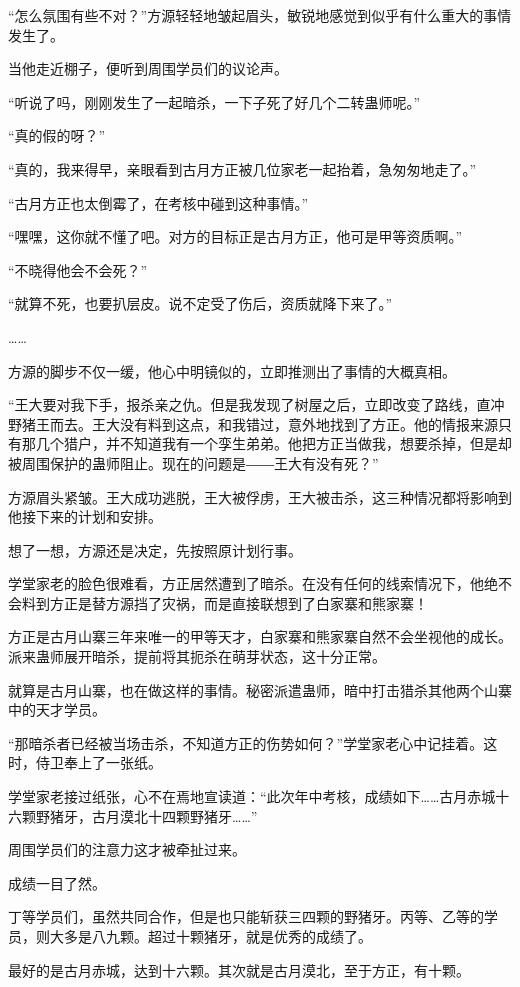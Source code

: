 \begin{this_body}
“怎么氛围有些不对？”方源轻轻地皱起眉头，敏锐地感觉到似乎有什么重大的事情发生了。

当他走近棚子，便听到周围学员们的议论声。

“听说了吗，刚刚发生了一起暗杀，一下子死了好几个二转蛊师呢。”

“真的假的呀？”

“真的，我来得早，亲眼看到古月方正被几位家老一起抬着，急匆匆地走了。”

“古月方正也太倒霉了，在考核中碰到这种事情。”

“嘿嘿，这你就不懂了吧。对方的目标正是古月方正，他可是甲等资质啊。”

“不晓得他会不会死？”

“就算不死，也要扒层皮。说不定受了伤后，资质就降下来了。”

……

方源的脚步不仅一缓，他心中明镜似的，立即推测出了事情的大概真相。

“王大要对我下手，报杀亲之仇。但是我发现了树屋之后，立即改变了路线，直冲野猪王而去。王大没有料到这点，和我错过，意外地找到了方正。他的情报来源只有那几个猎户，并不知道我有一个孪生弟弟。他把方正当做我，想要杀掉，但是却被周围保护的蛊师阻止。现在的问题是――王大有没有死？”

方源眉头紧皱。王大成功逃脱，王大被俘虏，王大被击杀，这三种情况都将影响到他接下来的计划和安排。

想了一想，方源还是决定，先按照原计划行事。

学堂家老的脸色很难看，方正居然遭到了暗杀。在没有任何的线索情况下，他绝不会料到方正是替方源挡了灾祸，而是直接联想到了白家寨和熊家寨！

方正是古月山寨三年来唯一的甲等天才，白家寨和熊家寨自然不会坐视他的成长。派来蛊师展开暗杀，提前将其扼杀在萌芽状态，这十分正常。

就算是古月山寨，也在做这样的事情。秘密派遣蛊师，暗中打击猎杀其他两个山寨中的天才学员。

“那暗杀者已经被当场击杀，不知道方正的伤势如何？”学堂家老心中记挂着。这时，侍卫奉上了一张纸。

学堂家老接过纸张，心不在焉地宣读道：“此次年中考核，成绩如下……古月赤城十六颗野猪牙，古月漠北十四颗野猪牙……”

周围学员们的注意力这才被牵扯过来。

成绩一目了然。

丁等学员们，虽然共同合作，但是也只能斩获三四颗的野猪牙。丙等、乙等的学员，则大多是八九颗。超过十颗猪牙，就是优秀的成绩了。

最好的是古月赤城，达到十六颗。其次就是古月漠北，至于方正，有十颗。


\end{this_body}
